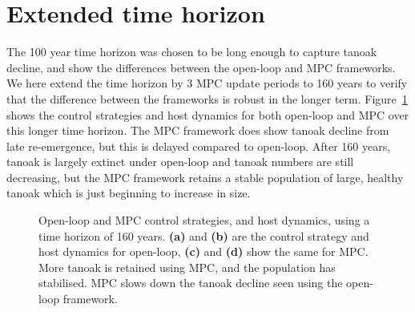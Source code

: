 \newpage
\section{Extended time horizon\label{app:mixed_stand_3}}

The 100 year time horizon was chosen to be long enough to capture tanoak decline, and show the differences between the open-loop and MPC frameworks. We here extend the time horizon by 3 MPC update periods to 160 years to verify that the difference between the frameworks is robust in the longer term. Figure~\ref{fig:extend_time_horizon} shows the control strategies and host dynamics for both open-loop and MPC over this longer time horizon. The MPC framework does show tanoak decline from late re-emergence, but this is delayed compared to open-loop. After 160 years, tanoak is largely extinct under open-loop and tanoak numbers are still decreasing, but the MPC framework retains a stable population of large, healthy tanoak which is just beginning to increase in size.

\vspace*{\floatsep}
\begin{figure}[H]
    \begin{center}
        \caption[Extending the time horizon]{Open-loop and MPC control strategies, and host dynamics, using a time horizon of 160 years. \textbf{(a)} and \textbf{(b)} are the control strategy and host dynamics for open-loop, \textbf{(c)} and \textbf{(d)} show the same for MPC. More tanoak is retained using MPC, and the population has stabilised. MPC slows down the tanoak decline seen using the open-loop framework.\label{fig:extend_time_horizon}}
    \end{center}
\end{figure}

